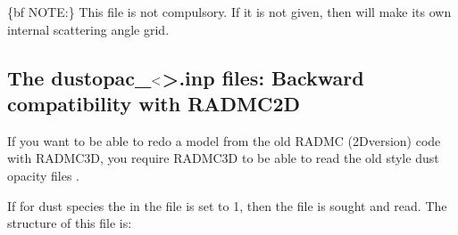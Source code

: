 \documentclass[letterpaper,10pt,english]{sphinxmanual}
\begin{document}
\begin{sphinxVerbatim}[commandchars=\\\{\}]
                 
               
                 
               
\end{sphinxVerbatim}

\{bf NOTE:\} This file is not compulsory. If it is not given, then
 will make its own internal scattering angle grid.


\subsection{The {\color{red}\bfseries{}dustopac\_}\protect\(<\protect\)\textgreater{}\textasciigrave{}.inp files: Backward compatibility with RADMC\sphinxhyphen{}2D}
\label{\detokenize{inputoutputfiles:the-dustopac-inp-files-backward-compatibility-with-radmc-2d}}\label{\detokenize{inputoutputfiles:sec-dustopac-oldstyle}}
If you want to be able to redo a model from the old RADMC (2D\sphinxhyphen{}version) code
with RADMC\sphinxhyphen{}3D, you require RADMC\sphinxhyphen{}3D to be able to read the old style
dust opacity files .

If for dust species  the  in the
 file is set to \sphinxhyphen{}1, then the file 
is sought and read. The structure of this file is:
\end{document}
